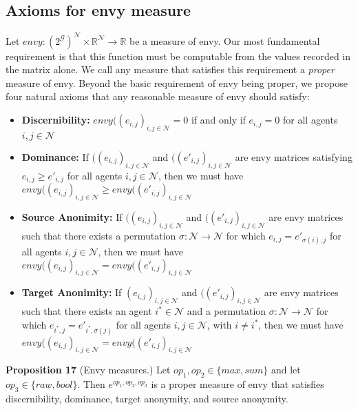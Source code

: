 \documentclass{article}
\begin{document}
\subsection{Axioms for envy measure}
Let $envy:(2^\mathcal{G})^\mathcal{N}\times \mathbb{R}^\mathcal{N}\rightarrow \mathbb{R}$ be a measure of envy. Our most fundamental requirement is that this function must be computable from the values recorded in the matrix alone. We call any measure that satisfies this requirement a \textit{proper} measure of envy. Beyond the basic requirement of envy being proper, we propose four natural axioms that any reasonable measure of envy should satisfy:
\begin{itemize}
    \item \textbf{Discernibility:} $envy((e_{i,j})_{i,j\in \mathcal{N}} = 0$ if and only if $e_{i,j}=0$ for all agents $i,j \in \mathcal{N}$
    \item \textbf{Dominance:} If $((e_{i,j})_{i,j\in \mathcal{N}}$ and $((e'_{i,j})_{i,j\in \mathcal{N}}$ are envy matrices satisfying $e_{i,j} \geq e'_{i,j}$ for all agents $i,j \in \mathcal{N}$, then we must have $envy((e_{i,j})_{i,j\in \mathcal{N}} \geq envy((e'_{i,j})_{i,j\in \mathcal{N}}$
    \item \textbf{Source Anonimity:} If $((e_{i,j})_{i,j\in \mathcal{N}}$ and $((e'_{i,j})_{i,j\in \mathcal{N}}$ are envy matrices such that there exists a permutation $\sigma : \mathcal{N} \rightarrow \mathcal{N}$ for which $e_{i,j} = e'_{\sigma(i),j}$ for all agents $i,j \in \mathcal{N}$, then we must have $envy((e_{i,j})_{i,j\in \mathcal{N}} = envy((e'_{i,j})_{i,j\in \mathcal{N}}$
    \item \textbf{Target Anonimity: }If $(e_{i,j})_{i,j\in \mathcal{N}}$ and $((e'_{i,j})_{i,j\in \mathcal{N}}$ are envy matrices such that there exists an agent $i^* \in \mathcal{N}$ and a permutation $\sigma : \mathcal{N} \rightarrow \mathcal{N}$ for which $e_{i^*,j} = e'_{i^*,\sigma(j)}$ for all agents $i,j \in \mathcal{N}$, with $i \neq i^*$, then we must have $envy((e_{i,j})_{i,j\in \mathcal{N}} = envy((e'_{i,j})_{i,j\in \mathcal{N}}$
\end{itemize}
\textbf{Proposition 17} (Envy measures.) Let $op_1, op_2 \in \{ max , sum \}$ and let $op_3 \in\{ raw , bool \}$. Then $e^{op_1 , op_2 , op_3}$ is a proper measure of envy that satisfies discernibility, dominance, target  anonymity, and source anonymity.
\end{document}
